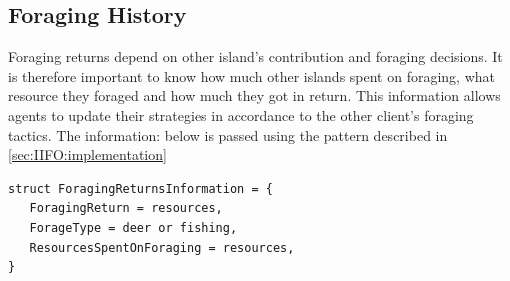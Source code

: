 \subsection{Foraging History}
\label{subsec:IIFO:foraging_history}
Foraging returns depend on other island's contribution and foraging decisions. It is therefore important to know how much other islands spent on foraging, what resource they foraged and how much they got in return. This information allows agents to update their strategies in accordance to the other client's foraging tactics. The information: below is passed using the pattern described in \ref{sec:IIFO:implementation}
\begin{verbatim}
struct ForagingReturnsInformation = {
   ForagingReturn = resources,
   ForageType = deer or fishing,
   ResourcesSpentOnForaging = resources,
}
\end{verbatim}

